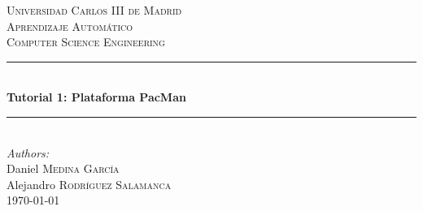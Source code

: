 \documentclass[12pt]{article}
\begin{document}
\begin{titlepage}

\newcommand{\HRule}{\rule{\linewidth}{0.5mm}} %

\center %


\textsc{\LARGE Universidad Carlos III de Madrid}\\[1.5cm] %
\textsc{\Large Aprendizaje Automático}\\[0.5cm] %
\textsc{\large Computer Science Engineering}\\[0.5cm] %


\HRule \\[0.4cm]
{ \huge \bfseries Tutorial 1: Plataforma PacMan}\\[0.4cm] %
\HRule \\[1.5cm]



\emph{Authors:}\\
Daniel \textsc{Medina García}\\ %
Alejandro \textsc{Rodríguez Salamanca}\\[3cm] %


{\large \today}\\[3cm] %




\vfill %

\end{titlepage}
\end{document}
